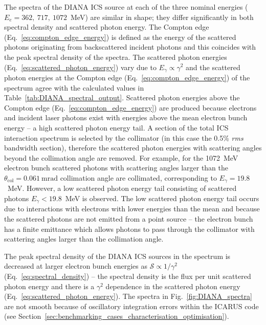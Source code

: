 \documentclass[../main.tex]{subfiles}
\begin{document}
The spectra of the DIANA ICS source at each of the three nominal energies ($E_{e} = 362,~717,~1072$~\si{\mega\electronvolt}) are similar in shape; they differ significantly in both spectral density and scattered photon energy. The Compton edge (Eq.~\ref{eq:compton_edge_energy}) is defined as the energy of the scattered photons originating from backscattered incident photons and this coincides with the peak spectral density of the spectra. The scattered photon energies (Eq.~\ref{eq:scattered_photon_energy}) vary due to $E_{\gamma}\propto\gamma^{2}$ and the scattered photon energies at the Compton edge (Eq.~\ref{eq:compton_edge_energy}) of the spectrum agree with the calculated values in Table~\ref{tab:DIANA_spectral_output}. Scattered photon energies above the Compton edge (Eq.~\ref{eq:compton_edge_energy}) are produced because electrons and incident laser photons exist with energies above the mean electron bunch energy -- a high scattered photon energy tail. A section of the total ICS interaction spectrum is selected by the collimator (in this case the 0.5\% \textit{rms} bandwidth section), therefore the scattered photon energies with scattering angles beyond the collimation angle are removed. For example, for the 1072~\si{\mega\electronvolt} electron bunch scattered photons with scattering angles larger than the  $\theta_{\mathrm{col}} = 0.061~\si{\milli\radian}$ collimation angle are collimated, corresponding to $E_{\gamma} = 19.8$~\si{\mega\electronvolt}. However, a low scattered photon energy tail consisting of scattered photons $E_{\gamma} < 19.8$~\si{\mega\electronvolt} is observed. The low scattered photon energy tail occurs due to interactions with 
electrons with lower energies than the mean and because the scattered photons are not emitted from a point source -- the electron bunch has a finite emittance which allows photons to pass through the collimator with scattering angles larger than the collimation angle.

The peak spectral density of the DIANA ICS sources in the spectrum is decreased at larger electron bunch energies as $\mathcal{S} \propto 1/\gamma^{2}$ (Eq.~\ref{eq:spectral_density}) -- the spectral density is the flux per unit scattered photon energy and there is a $\gamma^{2}$ dependence in the scattered photon energy (Eq.~\ref{eq:scattered_photon_energy}). The spectra in Fig.~\ref{fig:DIANA_spectra} are not smooth because of oscillatory integration errors within the \textsc{ICARUS} code (see Section~\ref{sec:benchmarking_cases_characterisation_optimisation}).
\end{document}
